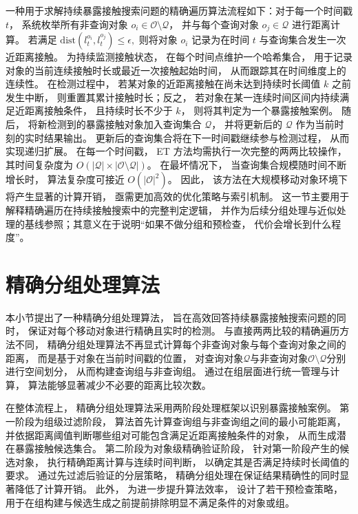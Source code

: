一种用于求解持续暴露接触搜索问题的精确遍历算法流程如下：对于每一个时间戳 $t$， 系统枚举所有非查询对象 $o_i \in \mathcal{O} \setminus \mathcal{Q}$， 并与每个查询对象 $o_j \in \mathcal{Q}$ 进行距离计算。 若满足
$
\mathrm{dist}(l_t^{o_i}, l_t^{o_j}) \le \epsilon,
$
则将对象 $o_i$ 记录为在时间 $t$ 与查询集合发生一次近距离接触。 为持续监测接触状态， 在每个时间点维护一个哈希集合， 用于记录对象的当前连续接触时长或最近一次接触起始时间， 从而跟踪其在时间维度上的连续性。 在检测过程中， 若某对象的近距离接触在尚未达到持续时长阈值 $k$ 之前发生中断， 则重置其累计接触时长；反之， 若对象在某一连续时间区间内持续满足近距离接触条件， 且持续时长不少于 $k$， 则将其判定为一个暴露接触案例。 随后， 将新检测到的暴露接触对象加入查询集合 $\mathcal{Q}$， 并将更新后的 $\mathcal{Q}$ 作为当前时刻的实时结果输出。 更新后的查询集合将在下一时间戳继续参与检测过程， 从而实现递归扩展。 在每一个时间戳， ET 方法均需执行一次完整的两两比较操作， 其时间复杂度为 $O(|\mathcal{Q}| \times |\mathcal{O} \setminus \mathcal{Q}|)$。 在最坏情况下， 当查询集合规模随时间不断增长时， 算法复杂度可接近 $O(|\mathcal{O}|^2)$。 因此， 该方法在大规模移动对象环境下将产生显著的计算开销， 亟需更加高效的优化策略与索引机制。 这一节主要用于解释精确遍历在持续接触搜索中的完整判定逻辑， 并作为后续分组处理与近似处理的基线参照；其意义在于说明“如果不做分组和预检查， 代价会增长到什么程度”。

\section{精确分组处理算法}
本小节提出了一种精确分组处理算法， 旨在高效回答持续暴露接触搜索问题的同时， 保证对每个移动对象进行精确且实时的检测。 与直接两两比较的精确遍历方法不同， 精确分组处理算法不再显式计算每个非查询对象与每个查询对象之间的距离， 而是基于对象在当前时间戳的位置， 对查询对象$\mathcal{Q}$与非查询对象$\mathcal{O} \setminus \mathcal{Q}$分别进行空间划分， 从而构建查询组与非查询组。 通过在组层面进行统一管理与计算， 算法能够显著减少不必要的距离比较次数。

在整体流程上， 精确分组处理算法采用两阶段处理框架以识别暴露接触案例。 第一阶段为组级过滤阶段， 算法首先计算查询组与非查询组之间的最小可能距离， 并依据距离阈值判断哪些组对可能包含满足近距离接触条件的对象， 从而生成潜在暴露接触候选集合。 第二阶段为对象级精确验证阶段， 针对第一阶段产生的候选对象， 执行精确距离计算与连续时间判断， 以确定其是否满足持续时长阈值的要求。 通过先过滤后验证的分层策略， 精确分组处理在保证结果精确性的同时显著降低了计算开销。 此外， 为进一步提升算法效率， 设计了若干预检查策略， 用于在组构建与候选生成之前提前排除明显不满足条件的对象或组。

